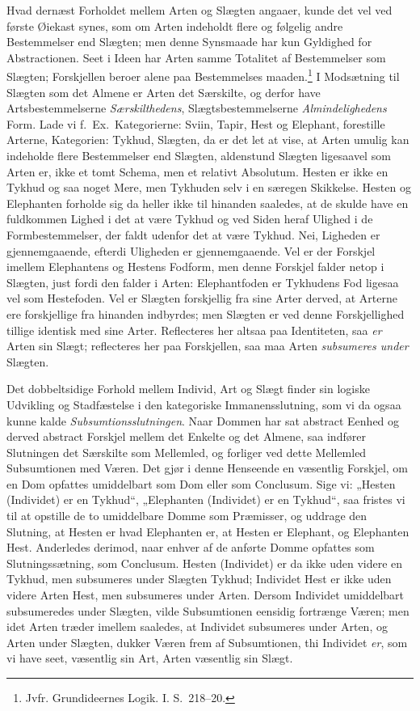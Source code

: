 \documentclass[12pt]{book}
\newcommand{\opage}[1]{\marginnote{\footnotesize\textit{[#1]}}}
\begin{document}
Hvad dernæst Forholdet mellem Arten og Slægten angaaer, kunde det vel ved første Øiekast synes, som om Arten indeholdt flere og følgelig andre Bestemmelser end Slægten; men denne Synsmaade har kun Gyldighed for Abstractionen. Seet i Ideen har Arten samme Totalitet af Bestemmelser som Slægten; Forskjellen beroer alene paa Bestemmelses%
\opage{349}maaden.\footnote{Jvfr. Grundideernes Logik. I. S.~218--20.}%
{} I Modsætning til Slægten som det Almene er Arten det Særskilte, og derfor have Artsbestemmelserne \emph{Særskilthedens}, Slægtsbestemmelserne \emph{Almindelighedens} Form. Lade vi f.\ Ex.\ Kategorierne: Sviin, Tapir, Hest og Elephant, forestille Arterne, Kategorien: Tykhud, Slægten, da er det let at vise, at Arten umulig kan indeholde flere Bestemmelser end Slægten, aldenstund Slægten ligesaavel som Arten er, ikke et tomt Schema, men et relativt Absolutum. Hesten er ikke en Tykhud og saa noget Mere, men Tykhuden selv i en særegen Skikkelse. Hesten og Elephanten forholde sig da heller ikke til hinanden saaledes, at de skulde have en fuldkommen Lighed i det at være Tykhud og ved Siden heraf Ulighed i de Formbestemmelser, der faldt udenfor det at være Tykhud. Nei, Ligheden er gjennemgaaende, efterdi Uligheden er gjennemgaaende. Vel er der Forskjel imellem Elephantens og Hestens Fodform, men denne Forskjel falder netop i Slægten, just fordi den falder i Arten: Elephantfoden er Tykhudens Fod ligesaa vel som Hestefoden. Vel er Slægten forskjellig fra sine Arter derved, at Arterne ere forskjellige fra hinanden indbyrdes; men Slægten er ved denne Forskjellighed tillige identisk med sine Arter. Reflecteres her altsaa paa Identiteten, saa \emph{er} Arten sin Slægt; reflecteres her paa Forskjellen, saa maa Arten \emph{subsumeres under} Slægten.

Det dobbeltsidige Forhold mellem Individ, Art og Slægt finder sin logiske Udvikling og Stadfæstelse i den kategoriske Immanensslutning, som vi da ogsaa kunne kalde \emph{Subsumtionsslutningen}. Naar Dommen har sat abstract Eenhed og derved abstract Forskjel mellem det Enkelte og det Almene, saa indfører Slutningen det Særskilte som Mellemled, og forliger ved dette Mellemled Subsumtionen med Væren. Det gjør i denne Henseende en væsentlig Forskjel, om en Dom opfattes umiddelbart som Dom eller som Conclusum. Sige
\opage{350}vi: „Hesten (Individet) er en Tykhud“, „Elephanten (Individet) er en Tykhud“, saa fristes vi til at opstille de to umiddelbare Domme som Præmisser, og uddrage den Slutning, at Hesten er hvad Elephanten er, at Hesten er Elephant, og Elephanten Hest. Anderledes derimod, naar enhver af de anførte Domme opfattes som Slutningssætning, som Conclusum. Hesten (Individet) er da ikke uden videre en Tykhud, men subsumeres under Slægten Tykhud; Individet Hest er ikke uden videre Arten Hest, men subsumeres under Arten. Dersom Individet umiddelbart subsumeredes under Slægten, vilde Subsumtionen eensidig fortrænge Væren; men idet Arten træder imellem saaledes, at Individet subsumeres under Arten, og Arten under Slægten, dukker Væren frem af Subsumtionen, thi Individet \emph{er}, som vi have seet, væsentlig sin Art, Arten væsentlig sin Slægt.
\end{document}

